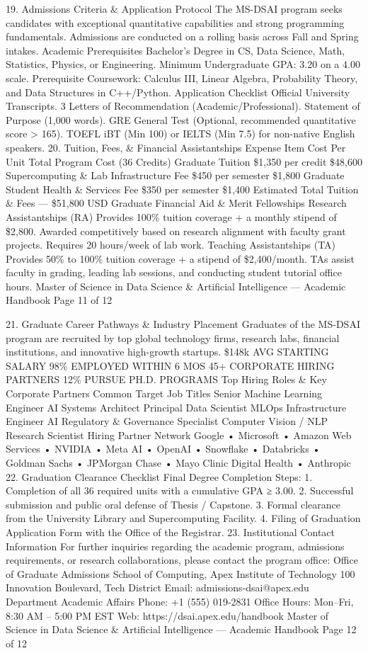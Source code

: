 \documentclass[12pt]{article}
\begin{document}
19. Admissions Criteria \& Application Protocol
The MS-DSAI program seeks candidates with exceptional quantitative capabilities and strong programming
fundamentals. Admissions are conducted on a rolling basis across Fall and Spring intakes.
Academic Prerequisites
Bachelor’s Degree in CS, Data Science, Math, Statistics,
Physics, or Engineering.
Minimum Undergraduate GPA: 3.20 on a 4.00 scale.
Prerequisite Coursework: Calculus III, Linear Algebra,
Probability Theory, and Data Structures in C++/Python.
Application Checklist
Official University Transcripts.
3 Letters of Recommendation (Academic/Professional).
Statement of Purpose (1,000 words).
GRE General Test (Optional, recommended quantitative
score > 165).
TOEFL iBT (Min 100) or IELTS (Min 7.5) for non-native
English speakers.
20. Tuition, Fees, \& Financial Assistantships
Expense Item
Cost Per Unit
Total Program Cost (36 Credits)
Graduate Tuition
\$1,350 per credit
\$48,600
Supercomputing \& Lab Infrastructure Fee
\$450 per semester
\$1,800
Graduate Student Health \& Services Fee
\$350 per semester
\$1,400
Estimated Total Tuition \& Fees
—
\$51,800 USD
Graduate Financial Aid \& Merit Fellowships
Research Assistantships (RA)
Provides 100\% tuition coverage + a monthly stipend of \$2,800.
Awarded competitively based on research alignment with
faculty grant projects. Requires 20 hours/week of lab work.
Teaching Assistantships (TA)
Provides 50\% to 100\% tuition coverage + a stipend of
\$2,400/month. TAs assist faculty in grading, leading lab
sessions, and conducting student tutorial office hours.
Master of Science in Data Science \& Artificial Intelligence — Academic Handbook
Page 11 of 12

21. Graduate Career Pathways \& Industry Placement
Graduates of the MS-DSAI program are recruited by top global technology firms, research labs, financial institutions,
and innovative high-growth startups.
\$148k
AVG STARTING SALARY
98\%
EMPLOYED WITHIN 6
MOS
45+
CORPORATE HIRING
PARTNERS
12\%
PURSUE PH.D.
PROGRAMS
Top Hiring Roles \& Key Corporate Partners
Common Target Job Titles
Senior Machine Learning Engineer
AI Systems Architect
Principal Data Scientist
MLOps Infrastructure Engineer
AI Regulatory \& Governance Specialist
Computer Vision / NLP Research Scientist
Hiring Partner Network
Google • Microsoft • Amazon Web Services • NVIDIA • Meta AI
• OpenAI • Snowflake • Databricks • Goldman Sachs •
JPMorgan Chase • Mayo Clinic Digital Health • Anthropic
22. Graduation Clearance Checklist
Final Degree Completion Steps:
1. Completion of all 36 required units with a cumulative GPA ≥ 3.00.
2. Successful submission and public oral defense of Thesis / Capstone.
3. Formal clearance from the University Library and Supercomputing Facility.
4. Filing of Graduation Application Form with the Office of the Registrar.
23. Institutional Contact Information
For further inquiries regarding the academic program, admissions requirements, or research collaborations, please contact
the program office:
Office of Graduate Admissions
School of Computing, Apex Institute of Technology
100 Innovation Boulevard, Tech District
Email: admissions-dsai@apex.edu
Department Academic Affairs
Phone: +1 (555) 019-2831
Office Hours: Mon–Fri, 8:30 AM – 5:00 PM EST
Web: https://dsai.apex.edu/handbook
Master of Science in Data Science \& Artificial Intelligence — Academic Handbook
Page 12 of 12
\end{document}
